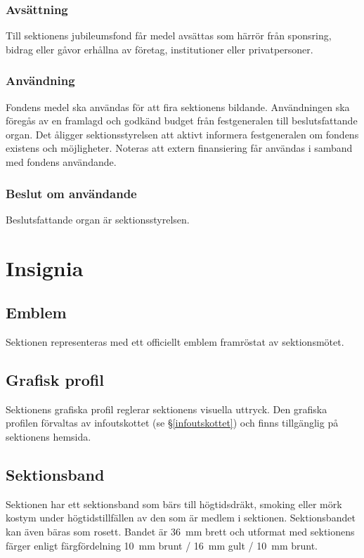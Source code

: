 \documentclass{datateknologsektionen-document}
\begin{document}
\subsubsection{Avsättning}
Till sektionens jubileumsfond får medel avsättas som härrör från sponsring, bidrag
eller gåvor erhållna av företag, institutioner eller privatpersoner.

\subsubsection{Användning}
Fondens medel ska användas för att fira sektionens bildande. Användningen ska föregås
av en framlagd och godkänd budget från festgeneralen till beslutsfattande organ. Det
åligger sektionsstyrelsen att aktivt informera festgeneralen om fondens existens och
möjligheter. Noteras att extern finansiering får användas i samband med fondens användande.

\subsubsection{Beslut om användande}
Beslutsfattande organ är sektionsstyrelsen.

\section{Insignia}
\subsection{Emblem}
Sektionen representeras med ett officiellt emblem framröstat av sektionsmötet.

\subsection{Grafisk profil}
Sektionens grafiska profil reglerar sektionens visuella uttryck. Den grafiska
profilen förvaltas av infoutskottet (se \S \ref{infoutskottet}) och finns tillgänglig på sektionens hemsida.

\subsection{Sektionsband}
Sektionen har ett sektionsband som bärs till högtidsdräkt, smoking eller mörk kostym
under högtidstillfällen av den som är medlem i sektionen. Sektionsbandet kan även
bäras som rosett. Bandet är 36~mm brett och utformat med sektionens färger enligt
färgfördelning 10~mm brunt / 16~mm gult / 10~mm brunt.
\end{document}
